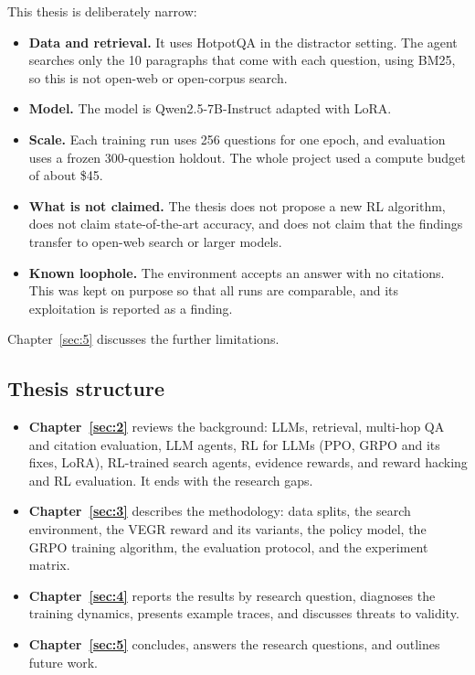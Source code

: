 This thesis is deliberately narrow:

\begin{itemize}
\tightlist
\item
  \textbf{Data and retrieval.} It uses HotpotQA in the distractor
  setting. The agent searches only the 10 paragraphs that come with each
  question, using BM25, so this is not open-web or open-corpus search.
\item
  \textbf{Model.} The model is Qwen2.5-7B-Instruct adapted with LoRA.
\item
  \textbf{Scale.} Each training run uses 256 questions for one epoch,
  and evaluation uses a frozen 300-question holdout. The whole project
  used a compute budget of about \$45.
\item
  \textbf{What is not claimed.} The thesis does not propose a new RL
  algorithm, does not claim state-of-the-art accuracy, and does not
  claim that the findings transfer to open-web search or larger models.
\item
  \textbf{Known loophole.} The environment accepts an answer with no
  citations. This was kept on purpose so that all runs are comparable,
  and its exploitation is reported as a finding.
\end{itemize}

Chapter~\ref{sec:5} discusses the further limitations.

\subsection{Thesis structure}\label{sec:1.7}

\begin{itemize}
\tightlist
\item
  \textbf{Chapter~\ref{sec:2}} reviews the background: LLMs, retrieval,
  multi-hop QA and citation evaluation, LLM agents, RL for LLMs (PPO,
  GRPO and its fixes, LoRA), RL-trained search agents, evidence rewards,
  and reward hacking and RL evaluation. It ends with the research gaps.
\item
  \textbf{Chapter~\ref{sec:3}} describes the methodology: data splits,
  the search environment, the VEGR reward and its variants, the policy
  model, the GRPO training algorithm, the evaluation protocol, and the
  experiment matrix.
\item
  \textbf{Chapter~\ref{sec:4}} reports the results by research question,
  diagnoses the training dynamics, presents example traces, and
  discusses threats to validity.
\item
  \textbf{Chapter~\ref{sec:5}} concludes, answers the research
  questions, and outlines future work.
\end{itemize}
